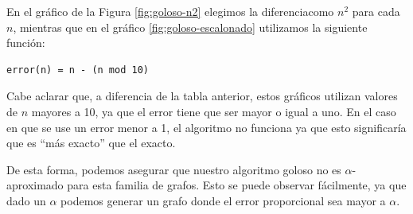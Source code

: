 En el gráfico de la Figura \ref{fig:goloso-n2} elegimos la diferenciacomo $n^2$ para cada $n$, mientras que en el gráfico \ref{fig:goloso-escalonado} utilizamos la siguiente función:
\begin{verbatim}
error(n) = n - (n mod 10)
\end{verbatim}

Cabe aclarar que, a diferencia de la tabla anterior, estos gráficos utilizan valores de $n$ mayores a 10, ya que el error tiene que ser mayor o igual a uno. En el caso en que se use un error menor a 1, el algoritmo no funciona ya que esto significaría que es ``más exacto'' que el exacto.

De esta forma, podemos asegurar que nuestro algoritmo goloso no es $\alpha$-aproximado para esta familia de grafos. Esto se puede observar fácilmente, ya que dado un $\alpha$ podemos generar un grafo donde el error proporcional sea mayor a $\alpha$.
